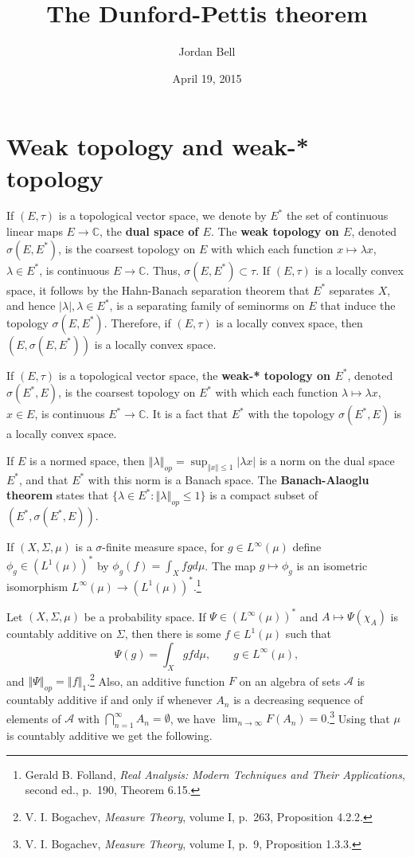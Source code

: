 \documentclass{article}
\newcommand{\norm}[1]{\left\Vert #1 \right\Vert}
\theoremstyle{definition}
\begin{document}
\title{The Dunford-Pettis theorem}
\author{Jordan Bell}
\date{April 19, 2015}

\maketitle

\section{Weak topology and weak-* topology}
If $(E,\tau)$ is a topological vector space, we denote by $E^*$ the set of continuous linear maps $E \to \mathbb{C}$, 
the \textbf{dual space of $E$}. 
The \textbf{weak topology on $E$}, denoted $\sigma(E,E^*)$, is the coarsest topology on $E$ with which
each function $x \mapsto \lambda x$, $\lambda \in E^*$, is continuous $E \to \mathbb{C}$.
Thus, $\sigma(E,E^*) \subset \tau$. 
If $(E,\tau)$ is a locally convex space, it follows by the Hahn-Banach separation theorem that $E^*$ separates $X$, and hence 
$|\lambda|, \lambda \in E^*$, is a separating family of seminorms on $E$ that induce the topology $\sigma(E,E^*)$. Therefore,
if $(E,\tau)$ is a locally convex space, then $(E,\sigma(E,E^*))$ is a locally convex space. 

If $(E,\tau)$ is a topological vector space, the \textbf{weak-* topology on $E^*$}, denoted
$\sigma(E^*,E)$, is the coarsest topology on $E^*$ with which each function
$\lambda \mapsto \lambda x$, $x \in E$, is continuous $E^* \to \mathbb{C}$. It is a fact that  $E^*$ with the topology
$\sigma(E^*,E)$ is a locally convex space.

If $E$ is a normed space, then $\norm{\lambda}_{op} = \sup_{\norm{x} \leq 1} |\lambda x|$ is a norm on the dual
space $E^*$, and that $E^*$ with this norm is a Banach space. The \textbf{Banach-Alaoglu theorem} states that $\{\lambda \in E^*: \norm{\lambda}_{op} \leq 1\}$
is a compact subset of $(E^*, \sigma(E^*,E))$.


If $(X,\Sigma,\mu)$ is a $\sigma$-finite measure space, for
$g \in L^\infty(\mu)$ define $\phi_g \in (L^1(\mu))^*$ by
$\phi_g(f) = \int_X fg d\mu$. The map
$g \mapsto \phi_g$ is an isometric isomorphism
$L^\infty(\mu) \to  (L^1(\mu))^*$.\footnote{Gerald B. Folland, {\em Real Analysis: Modern Techniques and Their Applications},
second ed., p.~190, Theorem 6.15.} 





Let $(X,\Sigma,\mu)$ be a probability space. If $\Psi \in (L^\infty(\mu))^*$ and $A \mapsto \Psi(\chi_A)$ is countably
additive on $\Sigma$, then there is some $f \in L^1(\mu)$ such that
\[
\Psi(g) = \int_X g f d\mu, \qquad g \in L^\infty(\mu),
\]
and $\norm{\Psi}_{op} = \norm{f}_1$.\footnote{V. I. Bogachev, {\em Measure Theory}, volume I,
p.~263, Proposition 4.2.2.}
Also, an additive  function $F$ on an algebra of sets $\mathscr{A}$ is countably additive
if and only if whenever $A_n$ is a decreasing sequence of elements of $\mathscr{A}$ with
$\bigcap_{n=1}^\infty A_n = \emptyset$, we have $\lim_{n\to \infty} F(A_n) = 0$.\footnote{V. I. Bogachev, {\em Measure Theory}, volume I,
p.~9, Proposition 1.3.3.} 
Using that $\mu$ is countably additive we get the following.
\end{document}
